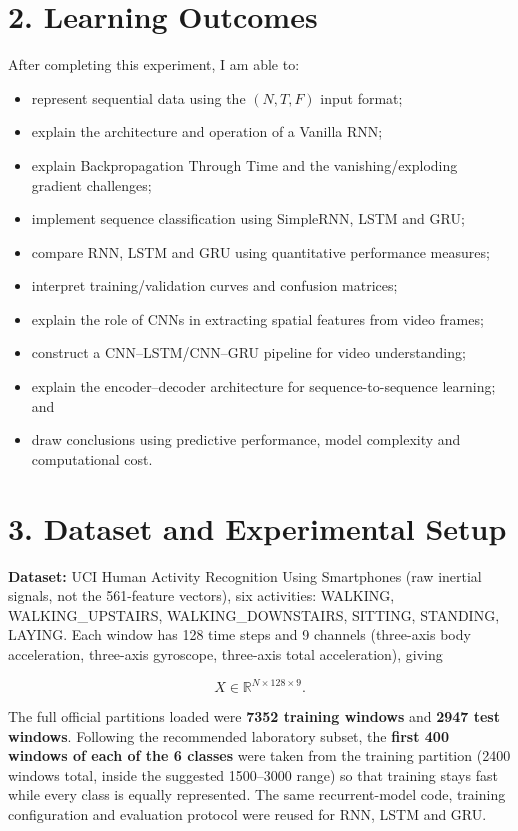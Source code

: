 \documentclass[10pt]{article}
\begin{document}
\section*{2. Learning Outcomes}

After completing this experiment, I am able to:

\begin{itemize}
\item represent sequential data using the $(N,T,F)$ input format;
\item explain the architecture and operation of a Vanilla RNN;
\item explain Backpropagation Through Time and the vanishing/exploding gradient challenges;
\item implement sequence classification using SimpleRNN, LSTM and GRU;
\item compare RNN, LSTM and GRU using quantitative performance measures;
\item interpret training/validation curves and confusion matrices;
\item explain the role of CNNs in extracting spatial features from video frames;
\item construct a CNN--LSTM/CNN--GRU pipeline for video understanding;
\item explain the encoder--decoder architecture for sequence-to-sequence learning; and
\item draw conclusions using predictive performance, model complexity and computational cost.
\end{itemize}

\section*{3. Dataset and Experimental Setup}

\textbf{Dataset:} UCI Human Activity Recognition Using Smartphones (raw inertial
signals, not the 561-feature vectors), six activities: WALKING,
WALKING\_UPSTAIRS, WALKING\_DOWNSTAIRS, SITTING, STANDING, LAYING. Each window
has 128 time steps and 9 channels (three-axis body acceleration, three-axis
gyroscope, three-axis total acceleration), giving

\[
X\in\mathbb{R}^{N\times128\times9}.
\]

The full official partitions loaded were \textbf{7352 training windows} and
\textbf{2947 test windows}. Following the recommended laboratory subset, the
\textbf{first 400 windows of each of the 6 classes} were taken from the
training partition (2400 windows total, inside the suggested 1500--3000
range) so that training stays fast while every class is equally represented.
The same recurrent-model code, training configuration and evaluation
protocol were reused for RNN, LSTM and GRU.
\end{document}

